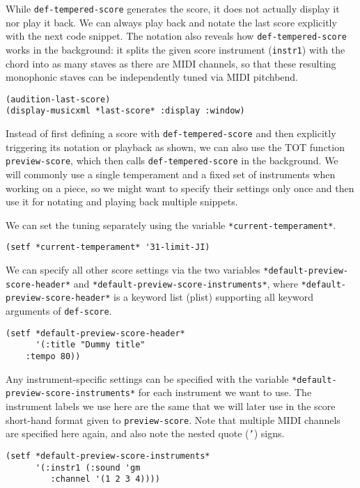 \documentclass[11pt]{article}
\begin{document}
While \texttt{def-tempered-score} generates the score, it does not actually display it nor play it
back. We can always play back and notate the last score explicitly with the next code snippet. The
notation also reveals how \texttt{def-tempered-score} works in the background: it splits the given
score instrument (\texttt{instr1}) with the chord into as many staves as there are MIDI channels, so that
these resulting monophonic staves can be independently tuned via MIDI pitchbend.

\begin{verbatim}
(audition-last-score)
(display-musicxml *last-score* :display :window)
\end{verbatim}

Instead of first defining a score with \texttt{def-tempered-score} and then explicitly triggering
its notation or playback as shown, we can also use the TOT function \texttt{preview-score}, which then calls
\texttt{def-tempered-score} in the background. We will commonly use a single temperament and a fixed set
of instruments when working on a piece, so we might want to specify their settings only once and
then use it for notating and playing back multiple snippets.

We can set the tuning separately using the variable \texttt{*current-temperament*}.

\begin{verbatim}
(setf *current-temperament* '31-limit-JI)
\end{verbatim}

We can specify all other score settings via the two variables \texttt{*default-preview-score-header*} and
\texttt{*default-preview-score-instruments*}, where \texttt{*default-preview-score-header*} is a keyword list
(plist) supporting all keyword arguments of \texttt{def-score}.

\begin{verbatim}
(setf *default-preview-score-header*
      '(:title "Dummy title"
	:tempo 80))
\end{verbatim}

Any instrument-specific settings can be specified with the variable
\texttt{*default-preview-score-instruments*} for each instrument we want to use. The instrument labels we
use here are the same that we will later use in the score short-hand format given to
\texttt{preview-score}. Note that multiple MIDI channels are specified here again, and also note the
nested quote (\texttt{'}) signs.

\begin{verbatim}
(setf *default-preview-score-instruments*
      '(:instr1 (:sound 'gm
		 :channel '(1 2 3 4))))
\end{verbatim}
\end{document}
